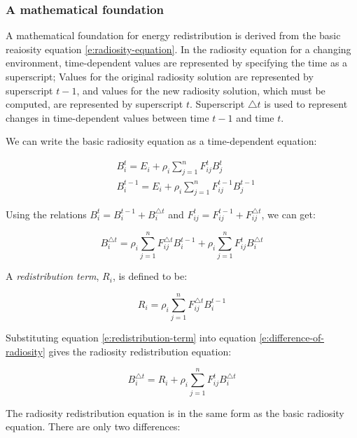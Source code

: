 \subsubsection{A mathematical foundation}
A mathematical foundation for energy redistribution is derived from the basic reaiosity equation \ref{e:radiosity-equation}. In the radiosity equation for a changing environment, time-dependent values are represented by specifying the time as a superscript; Values for the original radiosity solution are represented by superscript $t-1$, and values for the new radiosity solution, which must be computed, are represented by superscript $t$. Superscript $\triangle t$ is used to represent changes in time-dependent values between time $t-1$ and time $t$. 

We can write the basic radiosity equation as a time-dependent equation:

\begin{equation}
	\begin{aligned}
		&B^{t}_i=E_i+\rho_i \sum^{n}_{j=1}F^{t}_{ij}B^{t}_j\\
		&B^{t-1}_i=E_i+\rho_i \sum^{n}_{j=1}F^{t-1}_{ij}B^{t-1}_j
	\end{aligned}
\end{equation}

Using the relations $B^{t}_i=B^{t-1}_i+B^{\triangle t}_i$ and $F^{t}_{ij}=F^{t-1}_{ij}+F^{\triangle t}_{ij}$, we can get:

\begin{equation}\label{e:difference-of-radiosity}
	B^{\triangle t}_i=\rho_i\sum^{n}_{j=1}F^{\triangle t}_{ij}B^{t-1}_i+\rho_i\sum^{n}_{j=1}F^{t}_{ij}B^{\triangle t}_i
\end{equation}

A \textit{redistribution term}, $R_i$, is defined to be:

\begin{equation}\label{e:redistribution-term}
	R_i=\rho_i\sum^{n}_{j=1}F^{\triangle t}_{ij}B^{t-1}_i
\end{equation}

Substituting equation \ref{e:redistribution-term} into equation \ref{e:difference-of-radiosity} gives the radiosity redistribution equation:

\begin{equation}
	B^{\triangle t}_i=R_i+\rho_i\sum^{n}_{j=1}F^{t}_{ij}B^{\triangle t}_i
\end{equation}

The radiosity redistribution equation is in the same form as the basic radiosity equation. There are only two differences:

